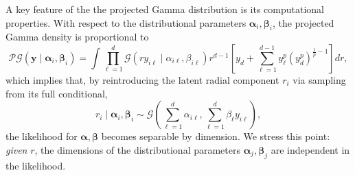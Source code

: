 A key feature of the the projected Gamma distribution is its computational properties.  With respect to the distributional parameters $\bm{\alpha}_i,\bm{\beta}_i$, the projected Gamma density is proportional to
\begin{equation*}
    \mathcal{PG}(\bm{y}\mid\bm{\alpha}_i,\bm{\beta}_i) = \int\prod_{\ell = 1}^d\mathcal{G}\left(ry_{i\ell}\mid\alpha_{i\ell},\beta_{i\ell}\right)r^{d-1}\left[y_d +
            {\textstyle \sum}_{\ell = 1}^{d-1}y_{\ell}^p\left(y_d^p\right)^{\frac{1}{p} - 1}\right]dr,
\end{equation*}
which implies that, by reintroducing the latent radial component $r_i$ via sampling from its full conditional,
\begin{equation}
    r_i\mid\bm{\alpha}_i,\bm{\beta}_i \sim \mathcal{G}\left(\sum_{\ell = 1}^d\alpha_{i\ell}, \sum_{\ell = 1}^d\beta_{\ell} y_{i\ell}\right),
\end{equation}
the likelihood for $\bm{\alpha},\bm{\beta}$ becomes separable by dimension.  We stress this point: \emph{given} $r$, the dimensions of the distributional parameters $\bm{\alpha}_j,\bm{\beta}_j$ are independent in the likelihood.

